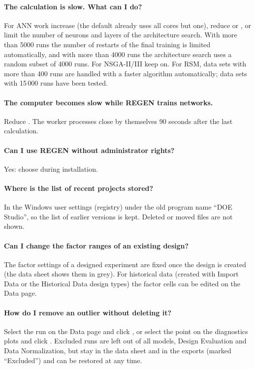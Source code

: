 \paragraph{The calculation is slow. What can I do?}
For ANN work increase  (the default already uses all cores but one), reduce
 or , or limit the number of neurons and layers of the
architecture search. With more than 5000 runs the number of restarts of the final training is limited
automatically, and with more than 4000 runs the architecture search uses a random subset of 4000 runs. For
NSGA-II/III keep  on. For RSM, data sets with more than 400 runs are handled
with a faster algorithm automatically; data sets with 15\,000 runs have been tested.

\paragraph{The computer becomes slow while REGEN trains networks.}
Reduce . The worker processes close by themselves 90 seconds after the last calculation.

\paragraph{Can I use REGEN without administrator rights?}
Yes: choose  during installation.

\paragraph{Where is the list of recent projects stored?}
In the Windows user settings (registry) under the old program name ``DOE Studio'', so the list of earlier versions
is kept. Deleted or moved files are not shown.

\paragraph{Can I change the factor ranges of an existing design?}
The factor settings of a designed experiment are fixed once the design is created (the data sheet shows them in
grey). For historical data (created with Import Data or the Historical Data design types) the factor cells can be
edited on the Data page.

\paragraph{How do I remove an outlier without deleting it?}
Select the run on the Data page and click , or select the point on the diagnostics plots
and click . Excluded runs are left out of all models, Design Evaluation and Data
Normalization, but stay in the data sheet and in the exports (marked ``Excluded'') and can be restored at any time.
